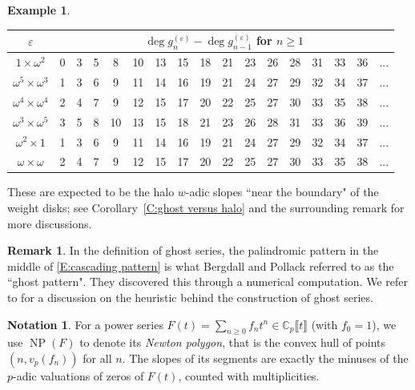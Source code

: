 \documentclass[12pt]{amsart}
\theoremstyle{definition}
\newtheorem{example}[subsection]{Example}
\newtheorem{remark}[subsection]{Remark}
\newtheorem{notation}[subsection]{Notation}
\numberwithin{equation}{subsection}
\def\CC{\mathbb{C}}
\DeclareMathOperator{\NP}{NP}
\begin{document}
\begin{example}
\begin{center}\renewcommand{\arraystretch}{1.2}
\begin{tabular}{|c|c|c|c|c|c|c|c|c|c|c|c|c|c|c|c|c|}
\hline
$\varepsilon$ & \multicolumn{16}{|c|}{$\deg g_n^{(\varepsilon)}- \deg g_{n-1}^{(\varepsilon)}$ for $n \geq 1$}
\\
\hline
$1\times \omega^2$ & 0 & 3 & 5 & 8 & 10 & 13 & 15 & 18 & 21 & 23 & 26 & 28&31&33&36 & ... \\ \hline
$\omega^5\times \omega^3$ &  1 & 3 & 6 & 9 & 11 & 14 & 16 & 19 & 21&24&27&29&32&34&37& ...
\\
 \hline
$\omega^4\times \omega^4$  & 2 & 4 & 7 & 9 & 12 &15 & 17 & 20 & 22&25&27&30&33&35&38& ...
\\ \hline
$\omega^3\times \omega^5$  &3 & 5 & 8 & 10 & 13 & 15 & 18 & 21 &23&26& 28&31&33&36&39& ...
\\ \hline
$\omega^2\times 1$ & 1 & 3 & 6 & 9 & 11 & 14 & 16 & 19 &21&24&27&29&32&34&37&...
\\ \hline
$\omega\times \omega$  & 2 & 4 & 7 & 9 & 12 &15 & 17 & 20 &22&25&27&30& 33&35&38&...
\\ \hline
\end{tabular}
\end{center}
These are expected to be the halo $w$-adic slopes ``near the boundary" of the weight disks; see Corollary~\ref{C:ghost versus halo} and the surrounding remark for more discussions.
\end{example}
\begin{remark}
\label{R:ghost pattern}
In the definition of ghost series, the palindromic pattern in the middle of \eqref{E:cascading pattern} is what Bergdall and Pollack referred to as the ``ghost pattern". They discovered this through a numerical computation. We refer to \cite[\S1]{bergdall-pollack2} for a discussion on the heuristic behind the construction of ghost series.
\end{remark}

\begin{notation}
\label{N:Newton polygon}
For a power series $F(t) = \sum_{n \geq 0} f_n t^n\in
\CC_p\llbracket t\rrbracket$ (with $f_0=1$), we use $\NP(F)$ to denote its \emph{Newton polygon}, that is the convex hull of points $(n, v_p(f_n))$ for all $n$.
The slopes of its segments are exactly the minuses of the $p$-adic valuations of zeros of $F(t)$, counted with multiplicities.
\end{notation}
\end{document}
